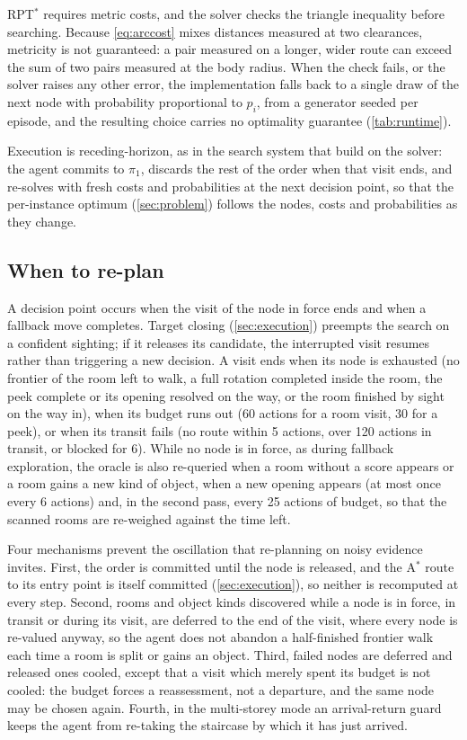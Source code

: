 \documentclass[10pt]{article}
\begin{document}
RPT$^*$ requires metric costs, and the solver checks the triangle inequality before searching. Because \cref{eq:arccost} mixes distances measured at two clearances, metricity is not guaranteed: a pair measured on a longer, wider route can exceed the sum of two pairs measured at the body radius. When the check fails, or the solver raises any other error, the implementation falls back to a single draw of the next node with probability proportional to $p_i$, from a generator seeded per episode, and the resulting choice carries no optimality guarantee (\cref{tab:runtime}).

Execution is receding-horizon, as in the search system that \citet{lyu2026rpt} build on the solver: the agent commits to $\pi_1$, discards the rest of the order when that visit ends, and re-solves with fresh costs and probabilities at the next decision point, so that the per-instance optimum (\cref{sec:problem}) follows the nodes, costs and probabilities as they change.

\subsection{When to re-plan}
\label{sec:planning-replan}

A decision point occurs when the visit of the node in force ends and when a fallback move completes. Target closing (\cref{sec:execution}) preempts the search on a confident sighting; if it releases its candidate, the interrupted visit resumes rather than triggering a new decision. A visit ends when its node is exhausted (no frontier of the room left to walk, a full rotation completed inside the room, the peek complete or its opening resolved on the way, or the room finished by sight on the way in), when its budget runs out (60 actions for a room visit, 30 for a peek), or when its transit fails (no route within 5 actions, over 120 actions in transit, or blocked for 6). While no node is in force, as during fallback exploration, the oracle is also re-queried when a room without a score appears or a room gains a new kind of object, when a new opening appears (at most once every 6 actions) and, in the second pass, every 25 actions of budget, so that the scanned rooms are re-weighed against the time left.

Four mechanisms prevent the oscillation that re-planning on noisy evidence invites. First, the order is committed until the node is released, and the A$^*$ route to its entry point is itself committed (\cref{sec:execution}), so neither is recomputed at every step. Second, rooms and object kinds discovered while a node is in force, in transit or during its visit, are deferred to the end of the visit, where every node is re-valued anyway, so the agent does not abandon a half-finished frontier walk each time a room is split or gains an object. Third, failed nodes are deferred and released ones cooled, except that a visit which merely spent its budget is not cooled: the budget forces a reassessment, not a departure, and the same node may be chosen again. Fourth, in the multi-storey mode an arrival-return guard keeps the agent from re-taking the staircase by which it has just arrived.
\end{document}
